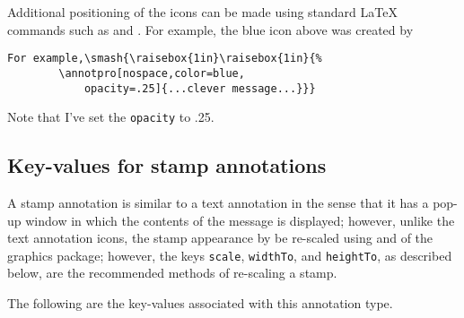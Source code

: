 \documentclass[12pt]{article}
\begin{document}
\begin{itemize}
    Additional positioning of the icons can be made using standard {\LaTeX}
    commands such as  and . For example, the blue icon above was created by
\begin{Verbatim}[fontsize=\footnotesize]
    For example,\smash{\raisebox{1in}\raisebox{1in}{%
        \annotpro[nospace,color=blue,
            opacity=.25]{...clever message...}}}
\end{Verbatim}
Note that I've set the \texttt{opacity} to .25.

\end{itemize}


\subsection{Key-values for stamp annotations}

A stamp annotation is similar to a text annotation in the sense that
it has a pop-up window in which the contents of the message is
displayed; however, unlike the text annotation icons, the stamp
appearance by be re-scaled using  and  of
the graphics package; however, the keys \texttt{scale},
\texttt{widthTo}, and \texttt{heightTo}, as described below, are the
recommended methods of re-scaling a stamp.

The following are the key-values associated with this annotation type.
\end{document}
